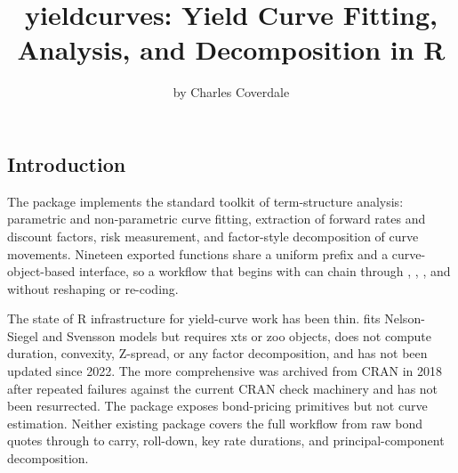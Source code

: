 \title{yieldcurves: Yield Curve Fitting, Analysis, and Decomposition in
R}
\author{by Charles Coverdale}

\maketitle


\subsection{Introduction}\label{introduction}

The  package implements the standard toolkit of
term-structure analysis: parametric and non-parametric curve fitting,
extraction of forward rates and discount factors, risk measurement, and
factor-style decomposition of curve movements. Nineteen exported
functions share a uniform  prefix and a curve-object-based
interface, so a workflow that begins with 
can chain through , ,
, and  without reshaping or re-coding.

The state of R infrastructure for yield-curve work has been thin.
 \citep{guirreri2022yieldcurve} fits Nelson-Siegel
and Svensson models but requires xts or zoo objects, does not compute
duration, convexity, Z-spread, or any factor decomposition, and has not
been updated since 2022. The more comprehensive  was
archived from CRAN in 2018 after repeated failures against the current
CRAN check machinery and has not been resurrected. The 
package exposes bond-pricing primitives but not curve estimation.
Neither existing package covers the full workflow from raw bond quotes
through to carry, roll-down, key rate durations, and principal-component
decomposition.

